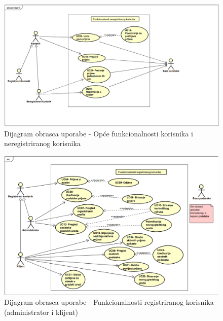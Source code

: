					\begin{figure}[H]
			\includegraphics[scale=0.8]{slike/obrazac_nereg.PNG} %
			\centering
			\caption{Dijagram obrasca uporabe - Opće funkcionalnosti korisnika i neregistriranog korisnika}
		\end{figure}
		
		
		\begin{figure}[H]
			\includegraphics[scale=0.8]{slike/obrazac_registereduser.PNG} %
			\centering
			\caption{Dijagram obrasca uporabe - Funkcionalnosti registriranog korisnika (administrator i klijent)}
		\end{figure}		
				
